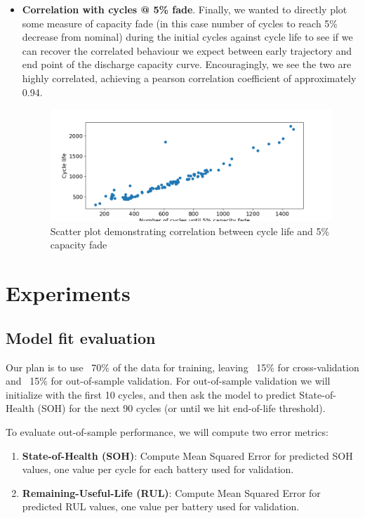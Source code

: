 \begin{itemize}
    \item \textbf{Correlation with cycles @ 5\% fade}. Finally, we wanted to directly plot some measure of capacity fade (in this case number of cycles to reach 5\% decrease from nominal) during the initial cycles against cycle life to see if we can recover the correlated behaviour we expect between early trajectory and end point of the discharge capacity curve. Encouragingly, we see the two are highly correlated, achieving a pearson correlation coefficient of approximately 0.94.

        \begin{figure}[H]
            \centering
            \includegraphics[scale=0.7] {figs/correlation_cycle_life_vs_5pct_fade.png}
            \caption{Scatter plot demonstrating correlation between cycle life and 5\% capacity fade}
            \label{fig:1e}
        \end{figure}

\end{itemize}


\section{Experiments}
\subsection{Model fit evaluation}

Our plan is to use ~70\% of the data for training, leaving ~15\% for cross-validation and ~15\% for out-of-sample validation. For out-of-sample validation we will initialize with the first 10 cycles, and then ask the model to predict State-of-Health (SOH) for the next 90 cycles (or until we hit end-of-life threshold).

To evaluate out-of-sample performance, we will compute two error metrics:
\begin{enumerate}
    \item \textbf{State-of-Health (SOH)}: Compute Mean Squared Error for predicted SOH values, one value per cycle for each battery used for validation. 
    \item \textbf{Remaining-Useful-Life (RUL)}: Compute Mean Squared Error for predicted RUL values, one value per battery used for validation.
\end{enumerate}

